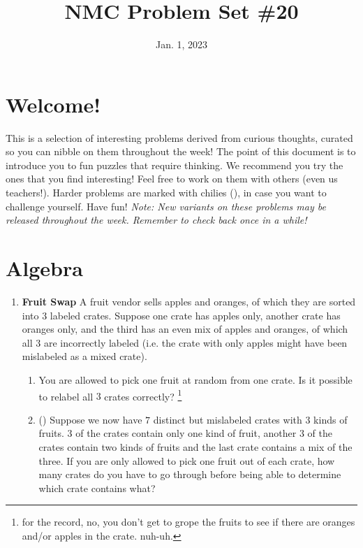 \documentclass[11pt]{scrartcl}
\begin{document}
\title{NMC Problem Set \#20} %
\date{Jan. 1, 2023} %
\maketitle

\section*{Welcome!}

This is a selection of interesting problems derived from curious thoughts, curated so you can nibble on them throughout the week! The point of this document is to introduce you to fun puzzles that require thinking. We recommend you try the ones that you find interesting! Feel free to work on them with others (even us teachers!). Harder problems are marked with chilies (\fullchili), in case you want to challenge yourself.
\newline\newline
Have fun! \textit{Note: New variants on these problems may be released throughout the week. Remember to check back once in a while!}
    
\section{Algebra}
\begin{enumerate}[label=\textbf{A\arabic*}.]
    \item \textbf{Fruit Swap} \newline
    A fruit vendor sells apples and oranges, of which they are sorted into $3$ labeled crates. Suppose one crate has apples only, another crate has oranges only, and the third has an even mix of apples and oranges, of which all $3$ are incorrectly labeled (i.e. the crate with only apples might have been mislabeled as a mixed crate).

    \begin{enumerate}
        \item You are allowed to pick one fruit at random from one crate. Is it possible to relabel all $3$ crates correctly? \footnote{for the record, no, you don't get to grope the fruits to see if there are oranges and/or apples in the crate. nuh-uh.}

        \item (\halfchili) Suppose we now have $7$ distinct but mislabeled crates with $3$ kinds of fruits. $3$ of the crates contain only one kind of fruit, another $3$ of the crates contain two kinds of fruits and the last crate contains a mix of the three. If you are only allowed to pick one fruit out of each crate, how many crates do you have to go through before being able to determine which crate contains what?
    \end{enumerate}
    
\end{enumerate}
\end{document}
